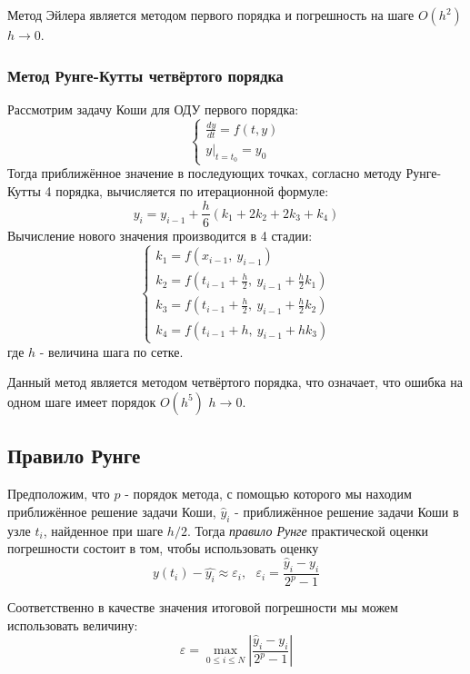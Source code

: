 \documentclass[12pt]{article}%
\begin{document}
Метод Эйлера является методом первого порядка и погрешность на шаге $O(h^2)$ $h \rightarrow 0$.

\subsubsection{Метод Рунге-Кутты четвёртого порядка}
Рассмотрим задачу Коши для ОДУ первого порядка:
$$
\begin{cases}
    \frac{dy}{dt} = f(t, y) \\
    y |_{t = t_0} = y_0
\end{cases}
$$
Тогда приближённое значение в последующих точках, согласно методу Рунге-Кутты 4 порядка, вычисляется по итерационной формуле:
\begin{equation}
    y_{i} = y_{i - 1} + \frac{h}{6}(k_1 + 2k_2 + 2k_3 + k_4)
\end{equation}
Вычисление нового значения производится в 4 стадии:
\begin{equation}
\begin{cases}
    k_1 = f(x_{i-1},\ y_{i-1}) \\
    k_2 = f\left(t_{i-1} + \frac{h}{2},\ y_{i-1} + \frac{h}{2}k_1 \right)\\
    k_3 = f\left(t_{i-1} + \frac{h}{2},\ y_{i-1} + \frac{h}{2}k_2 \right)\\
    k_4 = f\left(t_{i-1} + h,\ y_{i-1} + hk_3 \right)
\end{cases}
\end{equation}
где $h$ - величина шага по сетке.

Данный метод является методом четвёртого порядка, что означает, что ошибка на одном шаге имеет порядок $O(h^5)$ $h \rightarrow 0$.

\subsection{Правило Рунге}
Предположим, что $p$ - порядок метода, с помощью которого мы находим приближённое решение задачи Коши, $\hat{y}_{i}$ - приближённое решение задачи Коши в узле $t_i$, найденное при шаге $h/2$. Тогда \textit{правило Рунге} практической оценки погрешности состоит в том, чтобы использовать оценку
\begin{equation}
    y(t_i) - \hat{y_i} \approx \varepsilon_i, \ \ \  \varepsilon_i = \frac{\hat{y}_{i} - y_i}{2^p - 1}
\end{equation}

Соответственно в качестве значения итоговой погрешности мы можем использовать величину:
\begin{equation}
    \varepsilon = \max\limits_{0 \le i \le N}
    \left|\frac{\hat{y}_{i} - y_i}{2^p - 1}\right|
\end{equation}
\end{document}
